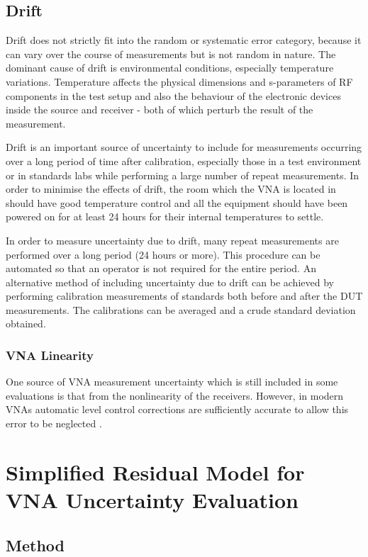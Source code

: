 \documentclass[../thesis/thesis.tex]{subfiles}
\begin{document}
\begin{refsection}
\subsection{Drift}

Drift does not strictly fit into the random or systematic error category, because it can vary over the course of measurements but is not random in nature. The dominant cause of drift is environmental conditions, especially temperature variations. Temperature affects the physical dimensions and s-parameters of RF components in the test setup and also the behaviour of the electronic devices inside the source and receiver - both of which perturb the result of the measurement.

Drift is an important source of uncertainty to include for measurements occurring over a long period of time after calibration, especially those in a test environment or in standards labs while performing a large number of repeat measurements. In order to minimise the effects of drift, the room which the VNA is located in should have good temperature control and all the equipment should have been powered on for at least 24 hours for their internal temperatures to settle.

In order to measure uncertainty due to drift, many repeat measurements are performed over a long period (24 hours or more). This procedure can be automated so that an operator is not required for the entire period. An alternative method of including uncertainty due to drift can be achieved by performing calibration measurements of standards both before and after the DUT measurements. The calibrations can be averaged and a crude standard deviation obtained.

\subsubsection{VNA Linearity}

One source of VNA measurement uncertainty which is still included in some evaluations is that from the nonlinearity of the receivers. However, in modern VNAs automatic level control corrections are sufficiently accurate to allow this error to be neglected \cite{Rytting_2001, Martens_2007}.

\section{Simplified Residual Model for VNA Uncertainty Evaluation}
\subsection{Method}


\end{refsection}
\end{document}
